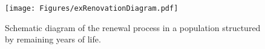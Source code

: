 \begin{figure}[ht!]
\begin{adjustwidth}{-1in}{1in}
        \centering  
          \caption{Schematic diagram of the renewal process in a population
          structured by remaining years of life.}
           \texttt{[image: Figures/exRenovationDiagram.pdf]}
          \label{fig:exrenewal}
          \end{adjustwidth}
\end{figure}

\FloatBarrier